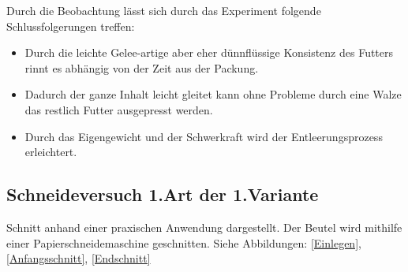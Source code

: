 Durch die Beobachtung lässt sich durch das Experiment folgende Schlussfolgerungen treffen: 

\begin{itemize}
\item Durch die leichte Gelee-artige aber eher dünnflüssige Konsistenz des Futters	rinnt es abhängig von der Zeit aus der Packung.
\item Dadurch der ganze Inhalt leicht gleitet kann ohne Probleme durch eine Walze das restlich Futter ausgepresst werden.
\item Durch das Eigengewicht und der Schwerkraft wird der Entleerungsprozess erleichtert.
\end{itemize} 

\subsection{Schneideversuch 1.Art der 1.Variante}

Schnitt anhand einer praxischen Anwendung dargestellt. Der Beutel wird mithilfe einer Papierschneidemaschine geschnitten. Siehe Abbildungen: \ref{Einlegen}, \ref{Anfangsschnitt}, \ref{Endschnitt}

